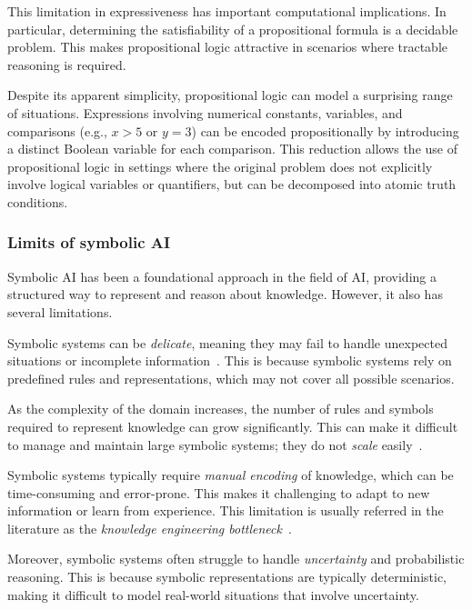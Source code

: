 This limitation in expressiveness has important computational implications.
%
In particular, determining the satisfiability of a propositional formula is a decidable problem.
%
This makes propositional logic attractive in scenarios where tractable reasoning is required.

Despite its apparent simplicity, propositional logic can model a surprising range of situations.
%
Expressions involving numerical constants, variables, and comparisons (e.g., $x > 5$ or $y = 3$) can be encoded propositionally by introducing a distinct Boolean variable for each comparison.
%
This reduction allows the use of propositional logic in settings where the original problem does not explicitly involve logical variables or quantifiers, but can be decomposed into atomic truth conditions.


\subsubsection[Limits of symbolic AI]{Limits of symbolic \Gls{AI}}\label{subsubsec:limits-of-symbolic-ai}
%
Symbolic \gls{AI} has been a foundational approach in the field of \gls{AI}, providing a structured way to represent and reason about knowledge.
%
However, it also has several limitations.


Symbolic systems can be \emph{delicate}, meaning they may fail to handle unexpected situations or incomplete information~\cite{DBLP:books/ox/90/McDermott90}.
%
This is because symbolic systems rely on predefined rules and representations, which may not cover all possible scenarios.


As the complexity of the domain increases, the number of rules and symbols required to represent knowledge can grow significantly.
%
This can make it difficult to manage and maintain large symbolic systems; they do not \emph{scale} easily~\cite{DBLP:journals/ai/LenatF91}.


Symbolic systems typically require \emph{manual encoding} of knowledge, which can be time-consuming and error-prone.
%
This makes it challenging to adapt to new information or learn from experience.
%
This limitation is usually referred in the literature as the \emph{knowledge engineering bottleneck}~\cite{DBLP:books/aw/RN2020}.


Moreover, symbolic systems often struggle to handle \emph{uncertainty} and probabilistic reasoning.
%
This is because symbolic representations are typically deterministic, making it difficult to model real-world situations that involve uncertainty.


